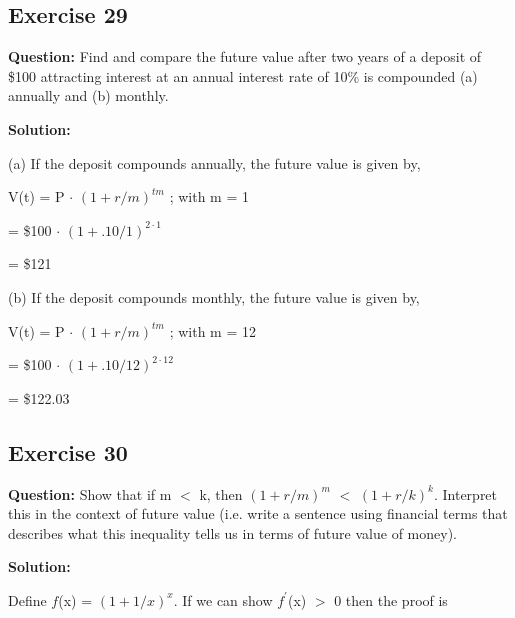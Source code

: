 \documentclass{article}
\begin{document}
\subsection*{Exercise 29}

\textbf{Question:} Find and compare the future value after two years of a deposit of \$100 attracting interest at an
annual interest rate of 10\% is compounded (a) annually and (b) monthly.

\textbf{Solution:}

(a) If the deposit compounds annually, the future value is given by,

\vspace{\baselineskip}

V(t) = P $\cdot$ $(1 + r/m) ^ {tm}$ ; with m = 1

\vspace{\baselineskip}

= \$100 $\cdot$ $(1 + .10/1) ^ {2 \cdot 1}$

\vspace{\baselineskip}

= \$121

\vspace{\baselineskip}

(b) If the deposit compounds monthly, the future value is given by,

\vspace{\baselineskip}

V(t) = P $\cdot$ $(1 + r/m) ^ {tm}$ ; with m = 12

\vspace{\baselineskip}

= \$100 $\cdot$ $(1 + .10/12) ^ {2 \cdot 12}$

\vspace{\baselineskip}

= \$122.03\textbf{}

\subsection*{Exercise 30}

\textbf{Question:} Show that if m $<$ k, then $(1 + r/m) ^ m$ $<$ $(1 + r/k)^k$.
Interpret this in the context of future value (i.e. write a sentence using financial terms that describes what this inequality tells us in terms of future value of money).

\textbf{Solution:}

Define $f$(x) = $(1 + 1/x) ^ x$. If we can show $f^\prime$(x) $>$ 0 then the proof is 
\end{document}
